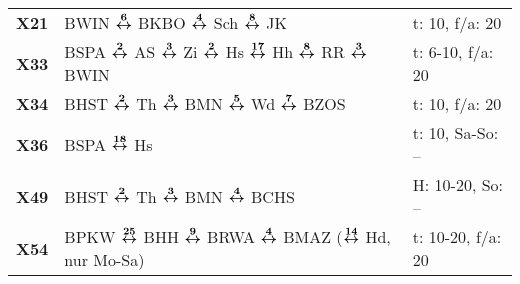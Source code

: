 \begin{minipage}[t]{0.45\textwidth}
\begin{tabular}{>{\bfseries}L{1.2cm}L{9.0cm}L{3.0cm}}
\xbus{} X21   & BWIN $\xarwe{6}$ BKBO $\xarwe{4}$ Sch $\xarwe{8}$ JK                                                                                                                & t: 10, f/a: 20             \\
\xbus{} X33   & BSPA $\xarwe{2}$ AS $\xarwe{3}$ Zi $\xarwe{2}$ Hs $\xarwe{17}$ Hh $\xarwe{8}$ RR $\xarwe{3}$ BWIN                                                                   & t: 6-10, f/a: 20           \\
\xbus{} X34   & BHST $\xarwe{2}$ Th $\xarwe{3}$ BMN $\xarwe{5}$ Wd $\xarwe{7}$ BZOS                                                                                                 & t: 10, f/a: 20             \\
\xbus{} X36   & BSPA $\xarwe{18}$ Hs
& t: 10, Sa-So: --           \\
\xbus{} X49   & BHST $\xarwe{2}$ Th $\xarwe{3}$ BMN $\xarwe{4}$ BCHS                                                                                                                & H: 10-20, So: --           \\
\xbus{} X54   & BPKW $\xarwe{25}$ BHH $\xarwe{9}$ BRWA $\xarwe{4}$ BMAZ ($\xarwe{14}$ Hd, nur Mo-Sa)                                                                                & t: 10-20, f/a: 20          \\
\hline
\end{tabular}
\end{minipage}
